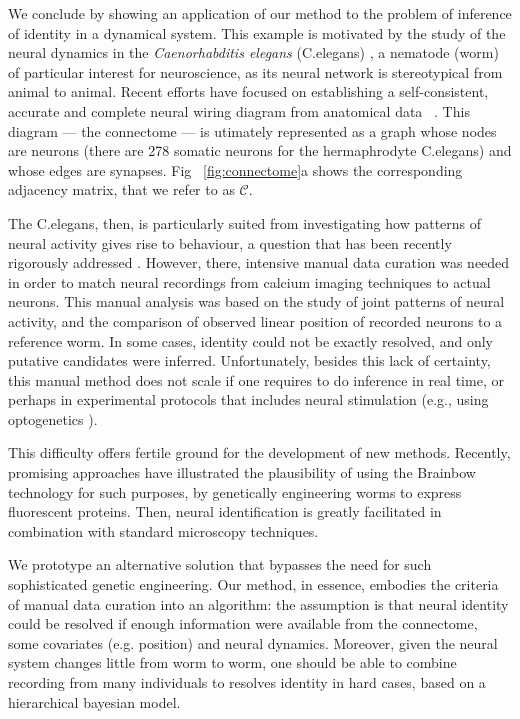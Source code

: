 \documentclass[twoside]{article}
\begin{document}
We conclude by showing an application of our method to the problem of inference of identity in a dynamical system. This example is motivated by the study of the neural dynamics in the \textit{Caenorhabditis elegans} (C.elegans)  \cite{Kato2015}, a nematode (worm) of particular interest for neuroscience, as its neural network is stereotypical from animal to animal. Recent efforts have focused on establishing a self-consistent, accurate and complete neural wiring diagram from anatomical data ~\citep{varshney2011structural}. This diagram --- the connectome --- is utimately represented as a graph whose nodes are neurons (there are 278 somatic neurons for the hermaphrodyte C.elegans) and whose edges are synapses. Fig ~\ref{fig:connectome}a shows the corresponding adjacency matrix, that we refer to as $\mathcal{C}$.

The C.elegans, then, is particularly suited from investigating how patterns of neural activity gives rise to behaviour, a question that has been recently rigorously addressed \cite{Kato2015}. However, there, intensive manual data curation was needed in order to match neural recordings from calcium imaging techniques to actual neurons. This manual analysis was based on the study of joint patterns of neural activity, and the comparison of observed linear position of recorded neurons to a reference worm. In some cases, identity could not be exactly resolved, and only putative candidates were inferred. Unfortunately, besides this lack of certainty, this manual method does not scale if one requires to do inference in real time, or perhaps in experimental protocols that includes neural stimulation (e.g., using optogenetics \cite{Grosenick2015}). 

This difficulty offers fertile ground for the development of new methods. Recently, promising approaches \cite{Aoki2017} have illustrated the plausibility of using the Brainbow technology \cite{Livet2007} for such purposes, by genetically engineering worms to express fluorescent proteins. Then, neural identification is greatly facilitated in combination with standard microscopy techniques.

We prototype an alternative solution that bypasses the need for such sophisticated genetic engineering. Our method, in essence, embodies the criteria of manual data curation into an algorithm: the assumption is that neural identity could be resolved if enough information were available from the connectome, some covariates (e.g. position) and neural dynamics. Moreover, given the neural system changes little from worm to worm, one should be able to combine recording from many individuals to resolves identity in hard cases, based on a hierarchical bayesian model.
\end{document}

